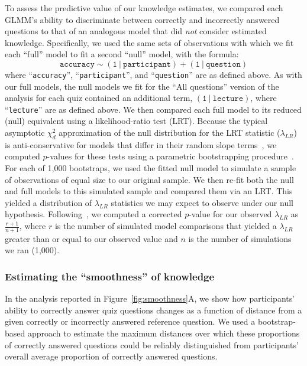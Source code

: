 \documentclass[10pt]{article}
\begin{document}
To assess the predictive value of our knowledge estimates, we compared each
GLMM's ability to discriminate between correctly and incorrectly answered
questions to that of an analogous model that did \textit{not} consider estimated
knowledge. Specifically, we used the same sets of observations with which we
fit each ``full'' model to fit a second ``null'' model, with the formula:
\[
    \mathtt{accuracy \sim (1\ \vert\ participant) + (1\ \vert\ question)}
\]
where ``\texttt{accuracy}'', ``\texttt{participant}'', and ``\texttt{question}'' are as defined above. 
As with our full models, the null models we fit for the “All questions” version of the analysis for each quiz contained an additional term, $\mathtt{(1\ \vert\ lecture)}$, where ``\texttt{lecture}'' are as defined above. 
We then compared each full model to its reduced (null) equivalent using a likelihood-ratio test (LRT). 
Because the typical asymptotic $\chi^2_d$ approximation of the null distribution for the LRT statistic ($\lambda_{LR}$) is anti-conservative for models that differ in their random slope terms~\citep{GoldSimo00,ScheEtal08b,SnijBosk11}, we computed $p$-values for these tests using a parametric bootstrapping procedure~\citep{HaleHojs14}. 
For each of 1,000 bootstraps, we used the fitted null model to simulate a sample of observations of equal size to our original sample.
We then re-fit both the null and full models to this simulated sample and compared them via an LRT.
This yielded a distribution of $\lambda_{LR}$ statistics we may expect to observe under our null hypothesis.
Following~\citep{DaviHink97,NortEtal02}, we computed a corrected $p$-value for our observed $\lambda_{LR}$ as $\frac{r + 1}{n + 1}$, where $r$ is the number of simulated model comparisons that yielded a $\lambda_{LR}$ greater than or equal to our observed value and $n$ is the number of simulations we ran (1,000).

\subsubsection*{Estimating the ``smoothness'' of knowledge}\label{subsec:smoothness}

In the analysis reported in Figure~\ref{fig:smoothness}A, we show how
participants' ability to correctly answer quiz questions changes as a function
of distance from a given correctly or incorrectly answered reference question.
We used a bootstrap-based approach to estimate the maximum distances over which
these proportions of correctly answered questions could be reliably
distinguished from participants' overall average proportion of correctly
answered questions.
\end{document}
